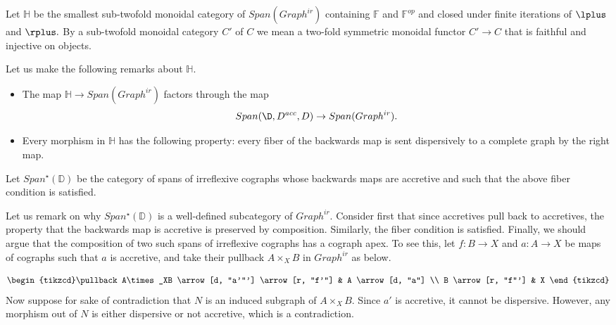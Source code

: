 Let $\mathbb{H}$ be the smallest sub-twofold monoidal category of $Span(Graph^{ir})$ containing $\mathbb{F}$ and $\mathbb{F}^{op}$ and closed under finite iterations of $\lplus$ and $\rplus.$ By a sub-twofold monoidal category $C'$ of $C$ we mean a two-fold symmetric monoidal functor $C'\rightarrow C$ that is faithful and injective on objects.

\begin{remark}
    Let us make the following remarks about $\mathbb{H}$.
    \begin{itemize}
        \item The map $\mathbb{H}\rightarrow Span(Graph^{ir})$ factors through the map $$Span(\D,D^{acc},D)\rightarrow Span(Graph^{ir}).$$
        \item Every morphism in $\mathbb{H}$ has the following property: every fiber of the backwards map is sent dispersively to a complete graph by the right map.
    \end{itemize}
\end{remark}

Let $Span^\star(\mathbb{D})$ be the category of spans of irreflexive cographs whose backwards maps are accretive and such that the above fiber condition is satisfied.

\begin{remark}
    Let us remark on why $Span^\star(\mathbb{D})$ is a well-defined subcategory of $Graph^{ir}$. Consider first that since accretives pull back to accretives, the property that the backwards map is accretive is preserved by composition. Similarly, the fiber condition is satisfied. Finally, we should argue that the composition of two such spans of irreflexive cographs has a cograph apex. To see this, let $f:B\rightarrow X$ and $a:A\rightarrow X$ be maps of cographs such that $a$ is accretive, and take their pullback $A\times_XB$ in $Graph^{ir}$ as below.

\[\begin{tikzcd}\pullback
A\times_XB \arrow[d, "a'"'] \arrow[r, "f'"] & A \arrow[d, "a"] \\
B \arrow[r, "f"']                           & X               
\end{tikzcd}\]
Now suppose for sake of contradiction that $N$ is an induced subgraph of $A\times_X B$. Since $a'$ is accretive, it cannot be dispersive. However, any morphism out of $N$ is either dispersive or not accretive, which is a contradiction.
\end{remark}

